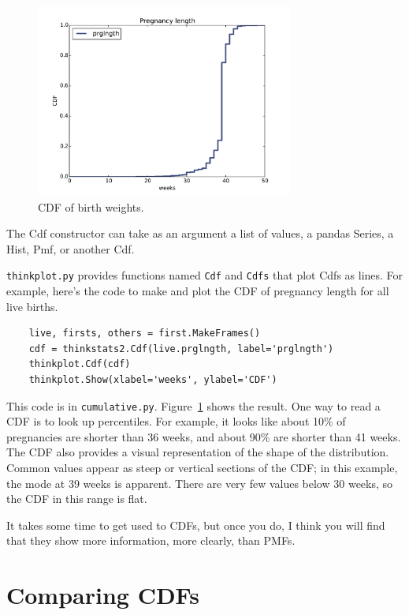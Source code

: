 \documentclass[12pt]{book}
\begin{document}
\begin{figure}
\centerline{\includegraphics[height=2.5in]{figs/cumulative_prglngth_cdf.pdf}}
\caption{CDF of birth weights.}
\label{cumulative_prglngth_cdf}
\end{figure}

The Cdf constructor can take as an argument a list of values,
a pandas Series, a Hist, Pmf, or another Cdf.

{\tt thinkplot.py} provides functions named {\tt Cdf} and
{\tt Cdfs} that plot Cdfs as lines.
For example, here's the code to make and plot the CDF of pregnancy
length for all live births.

\begin{verbatim}
    live, firsts, others = first.MakeFrames()
    cdf = thinkstats2.Cdf(live.prglngth, label='prglngth')
    thinkplot.Cdf(cdf)
    thinkplot.Show(xlabel='weeks', ylabel='CDF')
\end{verbatim}

This code is in {\tt cumulative.py}.
Figure~\ref{cumulative_prglngth_cdf} shows the result.  One way to
read a CDF is to look up percentiles.  For example, it looks like
about 10\% of pregnancies are shorter than 36 weeks, and about 90\%
are shorter than 41 weeks.  The CDF also provides a visual
representation of the shape of the distribution.  Common values appear
as steep or vertical sections of the CDF; in this example, the mode at
39 weeks is apparent.  There are very few values below 30 weeks, so
the CDF in this range is flat.

It takes some time to get used to CDFs, but once you
do, I think you will find that they show more information, more
clearly, than PMFs.


\section{Comparing CDFs}
\label{birth_weights}
\end{document}

